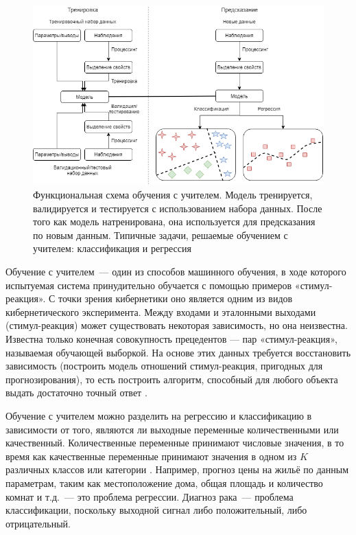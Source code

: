 \begin{figure}[ht!]
    \center
    \includegraphics [scale=0.60] {my_folder/images/ch1/supervised-learning.png}
    \caption{Функциональная схема обучения с учителем. Модель тренируется, валидируется и тестируется с использованием набора данных. После того как модель натренирована, она используется для предсказания по новым данным. Типичные задачи, решаемые обучением с учителем: классификация и регрессия}
    \label{fig:supervised-learning}
\end{figure}

Обучение с учителем~--- один из способов машинного обучения, в ходе которого испытуемая система принудительно обучается с помощью примеров «стимул-реакция». С точки зрения кибернетики оно является одним из видов кибернетического эксперимента. Между входами и эталонными выходами (стимул-реакция) может существовать некоторая зависимость, но она неизвестна. Известна только конечная совокупность прецедентов — пар «стимул-реакция», называемая обучающей выборкой. На основе этих данных требуется восстановить зависимость (построить модель отношений стимул-реакция, пригодных для прогнозирования), то есть построить алгоритм, способный для любого объекта выдать достаточно точный ответ \cite{james2014introduction}.

Обучение с учителем можно разделить на регрессию и классификацию в зависимости от того, являются ли выходные переменные количественными или качественный. Количественные переменные принимают числовые значения, в то время как качественные переменные принимают значения в одном из $K$ различных классов или категории \cite{james2014introduction}. Например, прогноз цены на жильё по данным параметрам, таким как местоположение дома, общая площадь и количество комнат и т.д.~--- это проблема регрессии. Диагноз рака~--- проблема классификации, поскольку выходной сигнал либо положительный, либо отрицательный.

